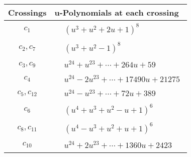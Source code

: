 \documentclass[1p]{elsarticle_modified}
\theoremstyle{definition}
\begin{document}
\begin{tabular}{m{50pt}|m{274pt}}
Crossings & \hspace{64pt}u-Polynomials at each crossing \\
\hline $$\begin{aligned}c_{1}\end{aligned}$$&$\begin{aligned}
&(u^3+u^2+2 u+1)^8
\end{aligned}$\\
\hline $$\begin{aligned}c_{2},c_{7}\end{aligned}$$&$\begin{aligned}
&(u^3+u^2-1)^8
\end{aligned}$\\
\hline $$\begin{aligned}c_{3},c_{9}\end{aligned}$$&$\begin{aligned}
&u^{24}+u^{23}+\cdots+264 u+59
\end{aligned}$\\
\hline $$\begin{aligned}c_{4}\end{aligned}$$&$\begin{aligned}
&u^{24}-2 u^{23}+\cdots+17490 u+21275
\end{aligned}$\\
\hline $$\begin{aligned}c_{5},c_{12}\end{aligned}$$&$\begin{aligned}
&u^{24}- u^{23}+\cdots+72 u+389
\end{aligned}$\\
\hline $$\begin{aligned}c_{6}\end{aligned}$$&$\begin{aligned}
&(u^4+u^3+u^2- u+1)^6
\end{aligned}$\\
\hline $$\begin{aligned}c_{8},c_{11}\end{aligned}$$&$\begin{aligned}
&(u^4- u^3+u^2+u+1)^6
\end{aligned}$\\
\hline $$\begin{aligned}c_{10}\end{aligned}$$&$\begin{aligned}
&u^{24}+2 u^{23}+\cdots+1360 u+2423
\end{aligned}$\\
\hline
\end{tabular}\\~\\
\end{document}
